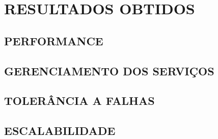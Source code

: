 \chapter{RESULTADOS OBTIDOS}
\label{chp:resultados}

\section{PERFORMANCE}

\section{GERENCIAMENTO DOS SERVIÇOS}

\section{TOLERÂNCIA A FALHAS}

\section{ESCALABILIDADE}
